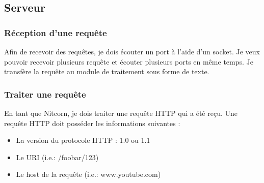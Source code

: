 \documentclass{scrreprt}
\begin{document}
\subsection{Serveur}
\subsubsection{Réception d'une requête}
Afin de recevoir des requêtes, je dois écouter un port à l'aide d'un socket. Je veux pouvoir recevoir plusieurs requête et écouter plusieurs ports en même temps. Je transfère la requête au module de traitement sous forme de texte.

\subsubsection{Traiter une requête}
En tant que Nitcorn, je dois traiter une requête HTTP qui a été reçu. Une requête
HTTP doit posséder les informations suivantes :
\begin{itemize}
    \item La version du protocole HTTP : 1.0 ou 1.1
    \item Le URI (i.e.: /foobar/123)
    \item Le host de la requête (i.e.: www.youtube.com)
\end{itemize}
\end{document}

